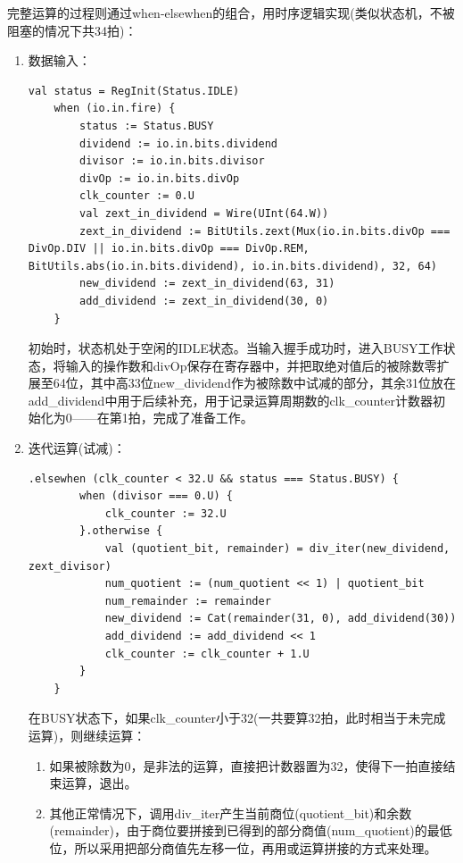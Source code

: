 \documentclass[11pt]{article}
\begin{document}
完整运算的过程则通过when-elsewhen的组合，用时序逻辑实现(类似状态机，不被阻塞的情况下共34拍)：
\begin{enumerate}
    \item 数据输入：
    \begin{lstlisting}[caption={数据输入}]
    val status = RegInit(Status.IDLE)
    when (io.in.fire) {
        status := Status.BUSY
        dividend := io.in.bits.dividend
        divisor := io.in.bits.divisor
        divOp := io.in.bits.divOp
        clk_counter := 0.U
        val zext_in_dividend = Wire(UInt(64.W))
        zext_in_dividend := BitUtils.zext(Mux(io.in.bits.divOp === DivOp.DIV || io.in.bits.divOp === DivOp.REM, BitUtils.abs(io.in.bits.dividend), io.in.bits.dividend), 32, 64)
        new_dividend := zext_in_dividend(63, 31)
        add_dividend := zext_in_dividend(30, 0)
    }
    \end{lstlisting}

    初始时，状态机处于空闲的IDLE状态。当输入握手成功时，进入BUSY工作状态，将输入的操作数和divOp保存在寄存器中，并把取绝对值后的被除数零扩展至64位，其中高33位new_dividend作为被除数中试减的部分，其余31位放在add_dividend中用于后续补充，用于记录运算周期数的clk_counter计数器初始化为0——在第1拍，完成了准备工作。

    \item 迭代运算(试减)：
    \begin{lstlisting}[caption={迭代试减(num_quotient和num_remainder用于保存最终结果)}]
    .elsewhen (clk_counter < 32.U && status === Status.BUSY) {
        when (divisor === 0.U) {
            clk_counter := 32.U
        }.otherwise {
            val (quotient_bit, remainder) = div_iter(new_dividend, zext_divisor)
            num_quotient := (num_quotient << 1) | quotient_bit
            num_remainder := remainder
            new_dividend := Cat(remainder(31, 0), add_dividend(30))
            add_dividend := add_dividend << 1
            clk_counter := clk_counter + 1.U
        }
    }
    \end{lstlisting}
    在BUSY状态下，如果clk_counter小于32(一共要算32拍，此时相当于未完成运算)，则继续运算：
    \begin{enumerate}
        \item 如果被除数为0，是非法的运算，直接把计数器置为32，使得下一拍直接结束运算，退出。
        \item 其他正常情况下，调用div_iter产生当前商位(quotient_bit)和余数(remainder)，由于商位要拼接到已得到的部分商值(num_quotient)的最低位，所以采用把部分商值先左移一位，再用或运算拼接的方式来处理。
        

\end{enumerate}
\end{enumerate}
\end{document}
